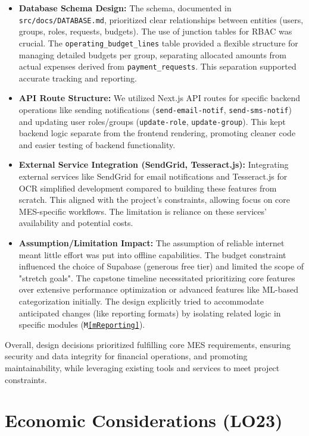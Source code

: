 \documentclass{article}
\begin{document}
\begin{itemize}
    \item \textbf{Database Schema Design:}
        The schema, documented in \texttt{src/docs/DATABASE.md}, prioritized clear relationships between entities (users, groups, roles, requests, budgets). The use of junction tables for RBAC was crucial. The \texttt{operating\_budget\_lines} table provided a flexible structure for managing detailed budgets per group, separating allocated amounts from actual expenses derived from \texttt{payment\_requests}. This separation supported accurate tracking and reporting.

    \item \textbf{API Route Structure:}
        We utilized Next.js API routes for specific backend operations like sending notifications (\texttt{send-email-notif}, \texttt{send-sms-notif}) and updating user roles/groups (\texttt{update-role}, \texttt{update-group}). This kept backend logic separate from the frontend rendering, promoting cleaner code and easier testing of backend functionality.

    \item \textbf{External Service Integration (SendGrid, Tesseract.js):}
        Integrating external services like SendGrid for email notifications and Tesseract.js for OCR simplified development compared to building these features from scratch. This aligned with the project's constraints, allowing focus on core MES-specific workflows. The limitation is reliance on these services' availability and potential costs.

    \item \textbf{Assumption/Limitation Impact:}
        The assumption of reliable internet meant little effort was put into offline capabilities. The budget constraint influenced the choice of Supabase (generous free tier) and limited the scope of "stretch goals". The capstone timeline necessitated prioritizing core features over extensive performance optimization or advanced features like ML-based categorization initially. The design explicitly tried to accommodate anticipated changes (like reporting formats) by isolating related logic in specific modules (\texttt{M\ref{mReporting}}).
\end{itemize}

Overall, design decisions prioritized fulfilling core MES requirements, ensuring security and data integrity for financial operations, and promoting maintainability, while leveraging existing tools and services to meet project constraints.


\section{Economic Considerations (LO23)}
\end{document}
